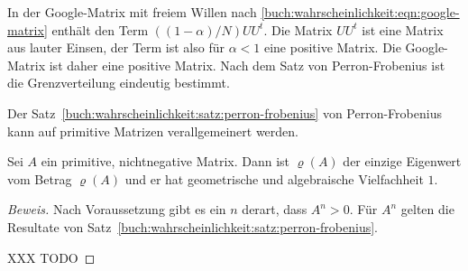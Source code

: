 \begin{beispiel}
In der Google-Matrix mit freiem Willen
nach
\eqref{buch:wahrscheinlichkeit:eqn:google-matrix}
enthält den Term $((1-\alpha)/N)UU^t$.
Die Matrix $UU^t$ ist eine Matrix aus lauter Einsen, der Term
ist also für $\alpha < 1$ eine positive Matrix.
Die Google-Matrix ist daher eine positive Matrix.
Nach dem Satz von Perron-Frobenius ist die Grenzverteilung
eindeutig bestimmt.
\end{beispiel}

Der Satz~\ref{buch:wahrscheinlichkeit:satz:perron-frobenius}
von Perron-Frobenius kann auf primitive Matrizen verallgemeinert
werden.

\begin{satz}
\label{buch:wahrscheinlichkeit:satz:perron-frobenius2}
Sei $A$ ein primitive, nichtnegative Matrix.
Dann ist $\varrho(A)$ der einzige Eigenwert vom Betrag $\varrho(A)$
und er hat geometrische und algebraische Vielfachheit $1$.
\end{satz}

\begin{proof}[Beweis]
Nach Voraussetzung gibt es ein $n$ derart, dass $A^n>0$.
Für $A^n$ gelten die Resultate von 
Satz~\ref{buch:wahrscheinlichkeit:satz:perron-frobenius}.

XXX TODO
\end{proof}
